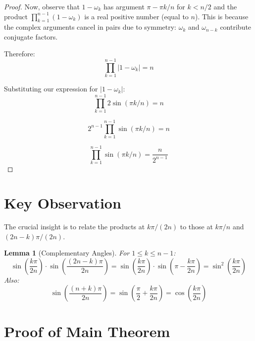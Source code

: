 \documentclass{article}
\newtheorem{lemma}{Lemma}
\begin{document}
\begin{proof}
Now, observe that $1 - \omega_k$ has argument $\pi - \pi k/n$ for $k < n/2$ and the product $\prod_{k=1}^{n-1}(1 - \omega_k)$ is a real positive number (equal to $n$). This is because the complex arguments cancel in pairs due to symmetry: $\omega_k$ and $\omega_{n-k}$ contribute conjugate factors.

Therefore:
\begin{equation}
\prod_{k=1}^{n-1}|1 - \omega_k| = n
\end{equation}

Substituting our expression for $|1 - \omega_k|$:
\begin{equation}
\prod_{k=1}^{n-1}2\sin(\pi k/n) = n
\end{equation}

\begin{equation}
2^{n-1}\prod_{k=1}^{n-1}\sin(\pi k/n) = n
\end{equation}

\begin{equation}
\prod_{k=1}^{n-1}\sin(\pi k/n) = \frac{n}{2^{n-1}}
\end{equation}
\end{proof}

\section{Key Observation}

The crucial insight is to relate the products at $k\pi/(2n)$ to those at $k\pi/n$ and $(2n-k)\pi/(2n)$.

\begin{lemma}[Complementary Angles]
For $1 \leq k \leq n-1$:
\begin{equation}
\sin\left(\frac{k\pi}{2n}\right) \cdot \sin\left(\frac{(2n-k)\pi}{2n}\right) = \sin\left(\frac{k\pi}{2n}\right) \cdot \sin\left(\pi - \frac{k\pi}{2n}\right) = \sin^2\left(\frac{k\pi}{2n}\right)
\end{equation}
Also:
\begin{equation}
\sin\left(\frac{(n+k)\pi}{2n}\right) = \sin\left(\frac{\pi}{2} + \frac{k\pi}{2n}\right) = \cos\left(\frac{k\pi}{2n}\right)
\end{equation}
\end{lemma}

\section{Proof of Main Theorem}
\end{document}
